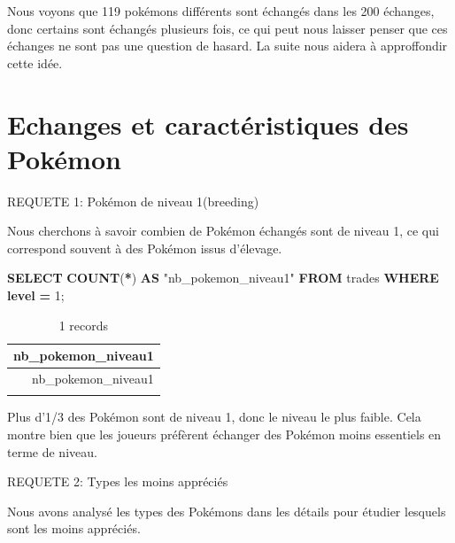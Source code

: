 \documentclass[mstat,12pt]{unswthesis}
\newenvironment{Shaded}{\begin{snugshade}}{\end{snugshade}}
\newcommand{\DecValTok}[1]{\textcolor[rgb]{0.00,0.00,0.81}{#1}}
\newcommand{\FunctionTok}[1]{\textcolor[rgb]{0.13,0.29,0.53}{\textbf{#1}}}
\newcommand{\KeywordTok}[1]{\textcolor[rgb]{0.13,0.29,0.53}{\textbf{#1}}}
\newcommand{\NormalTok}[1]{#1}
\newcommand{\OperatorTok}[1]{\textcolor[rgb]{0.81,0.36,0.00}{\textbf{#1}}}
\newcommand{\OtherTok}[1]{\textcolor[rgb]{0.56,0.35,0.01}{#1}}
\begin{document}
Nous voyons que 119 pokémons différents sont échangés dans les 200
échanges, donc certains sont échangés plusieurs fois, ce qui peut nous
laisser penser que ces échanges ne sont pas une question de hasard. La
suite nous aidera à approffondir cette idée.

\section{Echanges et caractéristiques des
Pokémon}\label{echanges-et-caractuxe9ristiques-des-pokuxe9mon}

\bigskip

REQUETE 1: Pokémon de niveau 1(breeding)

\bigskip

Nous cherchons à savoir combien de Pokémon échangés sont de niveau 1, ce
qui correspond souvent à des Pokémon issus d'élevage.

\begin{Shaded}
\begin{Highlighting}[]
\KeywordTok{SELECT} \FunctionTok{COUNT}\NormalTok{(}\OperatorTok{*}\NormalTok{) }\KeywordTok{AS} \OtherTok{"nb\_pokemon\_niveau1"}
\KeywordTok{FROM}\NormalTok{ trades}
\KeywordTok{WHERE} \KeywordTok{level} \OperatorTok{=} \DecValTok{1}\NormalTok{;}
\end{Highlighting}
\end{Shaded}

\begin{longtable}[]{@{}r@{}}
\caption{1 records}\tabularnewline
\toprule\noalign{}
nb\_pokemon\_niveau1 \\
\midrule\noalign{}
\endfirsthead
\toprule\noalign{}
nb\_pokemon\_niveau1 \\
\midrule\noalign{}
\endhead
\bottomrule\noalign{}
\endlastfoot
72 \\
\end{longtable}

Plus d'1/3 des Pokémon sont de niveau 1, donc le niveau le plus faible.
Cela montre bien que les joueurs préfèrent échanger des Pokémon moins
essentiels en terme de niveau.

\bigskip

REQUETE 2: Types les moins appréciés

\bigskip

Nous avons analysé les types des Pokémons dans les détails pour étudier
lesquels sont les moins appréciés.
\end{document}
